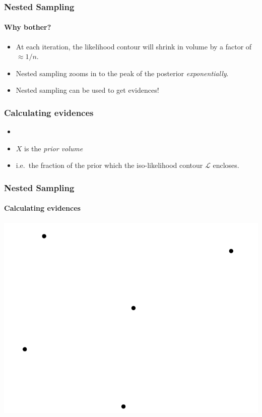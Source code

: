 \documentclass[]{beamer}
\newcommand{\lik}{\mathcal{L}}
\newcommand{\ev}{\mathcal{Z}}
\begin{document}


\begin{frame}
  \frametitle{Nested Sampling} 
  \framesubtitle{Why bother?} 
  
  \begin{itemize}
      \pause
    \item At each iteration, the likelihood contour will shrink in volume by a factor of $\approx 1/n$.
      \pause
    \item Nested sampling zooms in to the peak of the posterior {\em exponentially}.
      \pause
    \item Nested sampling can be used to get evidences!
  \end{itemize}

  
\end{frame}

\begin{frame}
  \frametitle{Calculating evidences}

  \begin{itemize}
    \item<2->  
      \onslide<2->{\[ 
        \ev = \int \lik(\theta)\pi(\theta)d\theta \onslide<5->{= \int \lik(X)dX}
      \] }
    \item<6-> $X$ is the {\em prior volume}
      \onslide<7->{%
        \[ X(\lik) = \int_{\lik(\theta)>\lik} \pi(\theta) d\theta \]
      }
    \item<8-> i.e.\ the fraction of the prior which the iso-likelihood contour $\lik$ encloses.
  \end{itemize}

\end{frame}

\begin{frame}
  \frametitle{Nested Sampling}
  \framesubtitle{Calculating evidences}
  \includegraphics[width=\textwidth,page=38]{figures/nested_sampling}
\end{frame}
\end{document}
